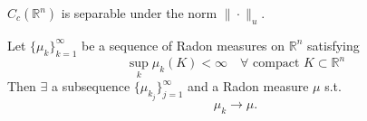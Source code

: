     \begin{lemma}
    $C_{c}(\mathbb{R}^{n})$ is separable under the norm $\| \cdot \|_{u}$.
    \label{lem:Cc_sep}
    \end{lemma}

    \begin{theorem}
    Let $\{ \mu _{k} \}_{k=1}^{\infty}$ be a sequence of Radon measures on $\mathbb{R}^{n}$ satisfying
        \begin{equation*}
            \sup_{k}\mu _{k}(K)<\infty \quad\forall \text{ compact }K\subset \mathbb{R}^{n}\tag{1}
        \end{equation*}
    Then $\exists$ a subsequence $\{ \mu _{k_{j}} \}_{j=1}^{\infty}$ and a Radon measure $\mu$ s.t.
        \begin{equation*}
            \mu _{k}\to \mu.
        \end{equation*}
    \label{thm:weakconv}
    \end{theorem}

